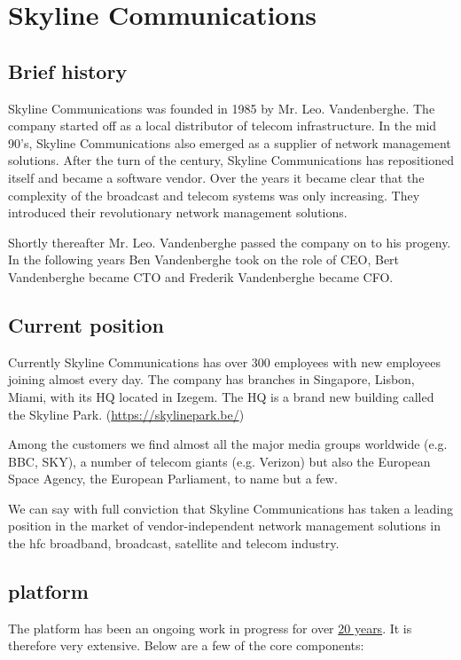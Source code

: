 
\chapter{Skyline Communications}
\section{Brief history}

Skyline Communications was founded in 1985 by Mr. Leo. Vandenberghe. The company started off as a local distributor of telecom infrastructure. In the mid 90's, Skyline Communications also emerged as a supplier of network management solutions. After the turn of the century, Skyline Communications has repositioned itself and became a software vendor. Over the years it became clear that the complexity of the broadcast and telecom systems was only increasing. They introduced their revolutionary \dm network management solutions.

Shortly thereafter Mr. Leo. Vandenberghe passed the company on to his progeny. In the following years Ben Vandenberghe took on the role of CEO, Bert Vandenberghe became CTO and Frederik Vandenberghe became CFO. 

\section{Current position}

Currently Skyline Communications has over 300 employees with new employees joining almost every day. 
The company has branches in Singapore, Lisbon, Miami, with its HQ located in Izegem. 
The HQ is a brand new building called the Skyline Park. (\url{https://skylinepark.be/})

Among the customers we find almost all the major media groups worldwide (e.g. BBC, SKY), a number of telecom giants (e.g. Verizon) but also the European Space Agency, the European Parliament, to name but a few. 

We can say with full conviction that Skyline Communications has taken a leading position in the market of vendor-independent network management solutions in the \gls{hfc} broadband, broadcast, satellite and telecom industry. 

\section{\dm platform}

The \dm platform has been an ongoing work in progress for over \underline{20 years}. It is therefore very extensive. Below are a few of the core components:


